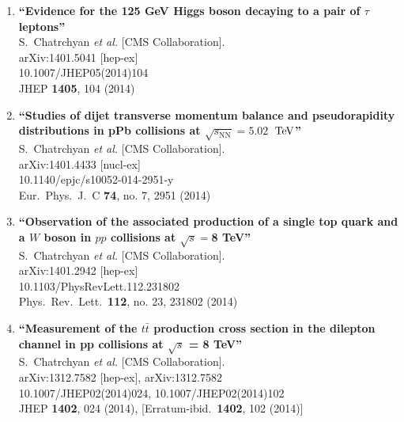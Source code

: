 \documentclass{article}
\begin{document}
\begin{enumerate}
\item%
{\bf ``Evidence for the 125 GeV Higgs boson decaying to a pair of $\tau$ leptons''}
  \\{}S.~Chatrchyan {\it et al.}  [CMS Collaboration].
  \\{}arXiv:1401.5041 [hep-ex]
    \\{}10.1007/JHEP05(2014)104
\\{}JHEP {\bf 1405}, 104 (2014) %


\item%
{\bf ``Studies of dijet transverse momentum balance and pseudorapidity distributions in pPb collisions at $\sqrt{s_{\mathrm{NN}}} = 5.02$ $\,\rm  {TeV}$''}
  \\{}S.~Chatrchyan {\it et al.}  [CMS Collaboration].
  \\{}arXiv:1401.4433 [nucl-ex]
    \\{}10.1140/epjc/s10052-014-2951-y
\\{}Eur.\ Phys.\ J.\ C {\bf 74}, no. 7, 2951 (2014) %


\item%
{\bf ``Observation of the associated production of a single top quark and a $W$ boson in $pp$ collisions at $\sqrt s = $8 TeV''}
  \\{}S.~Chatrchyan {\it et al.}  [CMS Collaboration].
  \\{}arXiv:1401.2942 [hep-ex]
    \\{}10.1103/PhysRevLett.112.231802
\\{}Phys.\ Rev.\ Lett.\  {\bf 112}, no. 23, 231802 (2014) %


\item%
{\bf ``Measurement of the $t \bar{t}$ production cross section in the dilepton channel in pp collisions at $\sqrt{s}$ = 8 TeV''}
  \\{}S.~Chatrchyan {\it et al.}  [CMS Collaboration].
  \\{}arXiv:1312.7582 [hep-ex], arXiv:1312.7582
    \\{}10.1007/JHEP02(2014)024, 10.1007/JHEP02(2014)102
\\{}JHEP {\bf 1402}, 024 (2014), [Erratum-ibid.\  {\bf 1402}, 102 (2014)] %



\end{enumerate}
\end{document}
